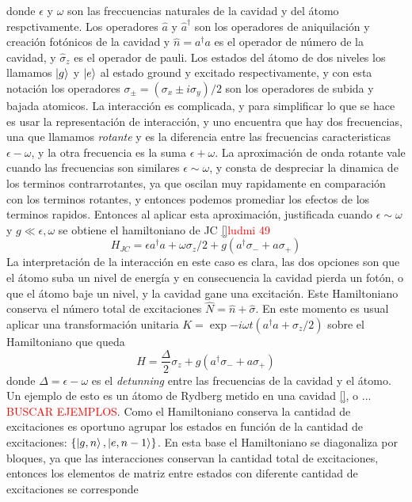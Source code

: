 donde $\epsilon$ y $\omega$ son las freccuencias naturales de la cavidad y del átomo respctivamente. Los operadores $\hat a$ y $\hat a^\dagger$ son los operadores de aniquilaci\'on y creaci\'on fot\'onicos de la cavidad y $\hat n =a^\dagger a$ es el operador de n\'umero de la cavidad, y $\hat \sigma_z$ es el operador de pauli. Los estados del átomo de dos niveles los llamamos $\ket{g}$ y $\ket{e}$ al estado ground y excitado respectivamente, y con esta notación los operadores $\sigma_\pm = (\sigma_x\pm i\sigma_y)/2$ son los operadores de subida y bajada atomicos. 
La interacci\'on es complicada, y para simplificar lo que se hace es usar la representaci\'on de interacci\'on, y uno encuentra que hay dos frecuencias, una que llamamos \textit{rotante} y es la diferencia entre las frecuencias caracteristicas $\epsilon-\omega$, y la otra frecuencia es la suma $\epsilon+\omega$. La aproximación de onda rotante vale cuando las frecuencias son similares $\epsilon\sim\omega$, y consta de despreciar la dinamica de los terminos contrarrotantes, ya que oscilan muy rapidamente en comparación con los terminos rotantes, y entonces podemos promediar los efectos de los terminos rapidos. Entonces al aplicar esta aproximación, justificada cuando $\epsilon\sim\omega$ y $g \ll \epsilon,\omega$ se obtiene el hamiltoniano de JC \ref{}\textcolor{red}{ludmi 49}
\begin{equation}
    H_{JC}=\epsilon a^\dagger a + \omega \sigma_z/2 + g(a^\dagger\sigma_-+a\sigma_+)
\end{equation} 
La interpretaci\'on de la interacci\'on en este caso es clara, las dos opciones son que el átomo suba un nivel de energ\'ia y en consecuencia la cavidad pierda un fot\'on, o que el átomo baje un nivel, y la cavidad gane una excitaci\'on. Este Hamiltoniano conserva el n\'umero total de excitaciones $\hat N= \hat n + \hat \sigma$. En este momento es usual aplicar una transformación unitaria $K=\exp{-i\omega t(a ^\dagger a + \sigma_z/2)}$ sobre el Hamiltoniano que queda 
\begin{equation}\label{eq3:hamiltoniano jcm}
    H=\frac{\Delta}{2}\sigma_z+g(a^\dagger \sigma_-+a \sigma_+)
\end{equation}
donde $\Delta = \epsilon - \omega$ es el \textit{detunning} entre las frecuencias de la cavidad y el átomo. Un ejemplo de esto es un átomo de Rydberg metido en una cavidad \ref{}, o ... \textcolor{red}{BUSCAR EJEMPLOS}.
Como el Hamiltoniano conserva la cantidad de excitaciones es oportuno agrupar los estados en funci\'on de la cantidad de excitaciones: $\{\ket{g,n},\ket{e,n-1}\}$. En esta base el Hamiltoniano se diagonaliza por bloques, ya que las interacciones conservan la cantidad total de excitaciones, entonces los elementos de matriz entre estados con diferente cantidad de excitaciones se corresponde
